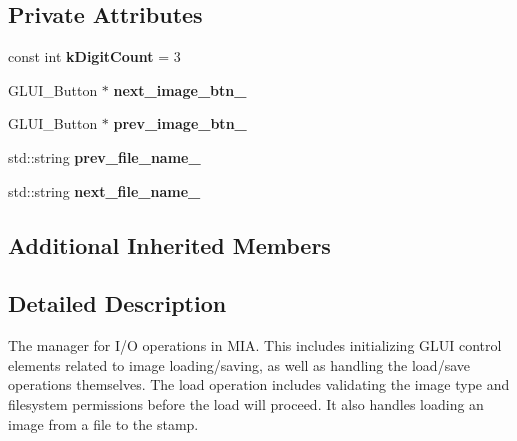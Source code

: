 \subsection*{Private Attributes}
\begin{DoxyCompactItemize}
\item 
const int {\bfseries k\+Digit\+Count} = 3\hypertarget{classimage__tools_1_1MIAIOManager_ae23ff91257f13ceb716b3f6b42d1decc}{}\label{classimage__tools_1_1MIAIOManager_ae23ff91257f13ceb716b3f6b42d1decc}

\item 
G\+L\+U\+I\+\_\+\+Button $\ast$ {\bfseries next\+\_\+image\+\_\+btn\+\_\+}\hypertarget{classimage__tools_1_1MIAIOManager_ac460a985e354d6723c9994f67a242e58}{}\label{classimage__tools_1_1MIAIOManager_ac460a985e354d6723c9994f67a242e58}

\item 
G\+L\+U\+I\+\_\+\+Button $\ast$ {\bfseries prev\+\_\+image\+\_\+btn\+\_\+}\hypertarget{classimage__tools_1_1MIAIOManager_a5a5240d979e795fb3525a3c2b71dd162}{}\label{classimage__tools_1_1MIAIOManager_a5a5240d979e795fb3525a3c2b71dd162}

\item 
std\+::string {\bfseries prev\+\_\+file\+\_\+name\+\_\+}\hypertarget{classimage__tools_1_1MIAIOManager_a19135385f2e4f3b2cc1df586738672e8}{}\label{classimage__tools_1_1MIAIOManager_a19135385f2e4f3b2cc1df586738672e8}

\item 
std\+::string {\bfseries next\+\_\+file\+\_\+name\+\_\+}\hypertarget{classimage__tools_1_1MIAIOManager_a5d047c8bdf266f5e6f1b99b744f2bc9d}{}\label{classimage__tools_1_1MIAIOManager_a5d047c8bdf266f5e6f1b99b744f2bc9d}

\end{DoxyCompactItemize}
\subsection*{Additional Inherited Members}


\subsection{Detailed Description}
The manager for I/O operations in M\+IA. This includes initializing G\+L\+UI control elements related to image loading/saving, as well as handling the load/save operations themselves. The load operation includes validating the image type and filesystem permissions before the load will proceed. It also handles loading an image from a file to the stamp. 

